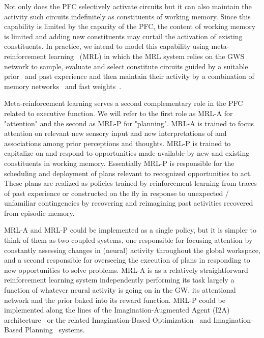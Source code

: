 Not only does the PFC selectively activate circuits but it can also maintain the activity such circuits indefinitely as constituents of working memory. Since this capability is limited by the capacity of the PFC, the content of working memory is limited and adding new constituents may curtail the activation of existing constituents. In practice, we intend to model this capability using meta-reinforcement learning~\cite{WangetalNATURE-NEUROSCIENCE-18} (MRL) in which the MRL system relies on the GWS network to sample, evaluate and select constitute circuits guided by a suitable prior~\cite{BengioCoRR-17} and past experience and then maintain their activity by a combination of memory networks~\cite{WestonetalCoRR-14} and fast weights~\cite{BaetalCoRR-16}. 


Meta-reinforcement learning serves a second complementary role in the PFC related to executive function. We will refer to the first role as MRL-A for "attention" and the second as MRL-P for "planning". MRL-A is trained to focus attention on relevant new sensory input and new interpretations of and associations among prior perceptions and thoughts. MRL-P is trained to capitalize on and respond to opportunities made available by new and existing constituents in working memory. Essentially MRL-P is responsible for the scheduling and deployment of plans relevant to recognized opportunities to act. These plans are realized as policies trained by reinforcement learning from traces of past experience or constructed on the fly in response to unexpected / unfamiliar contingencies by recovering and reimagining past activities recovered from episodic memory.

MRL-A and MRL-P could be implemented as a single policy, but it is simpler to think of them as two coupled systems, one responsible for focusing attention by constantly assessing changes in (neural) activity throughout the global workspace, and a second responsible for overseeing the execution of plans in responding to new opportunities to solve problems. MRL-A is as a relatively straightforward reinforcement learning system independently performing its task largely a function of whatever neural activity is going on in the GW, its attentional network and the prior baked into its reward function. MRL-P could be implemented along the lines of the Imagination-Augmented Agent (I2A) architecture~\cite{WeberetalCoRR-17} or the related Imagination-Based Optimization~\cite{HamricketalCoRR-17} and Imagination-Based Planning~\cite{PascanuetalCoRR-17} systems.

